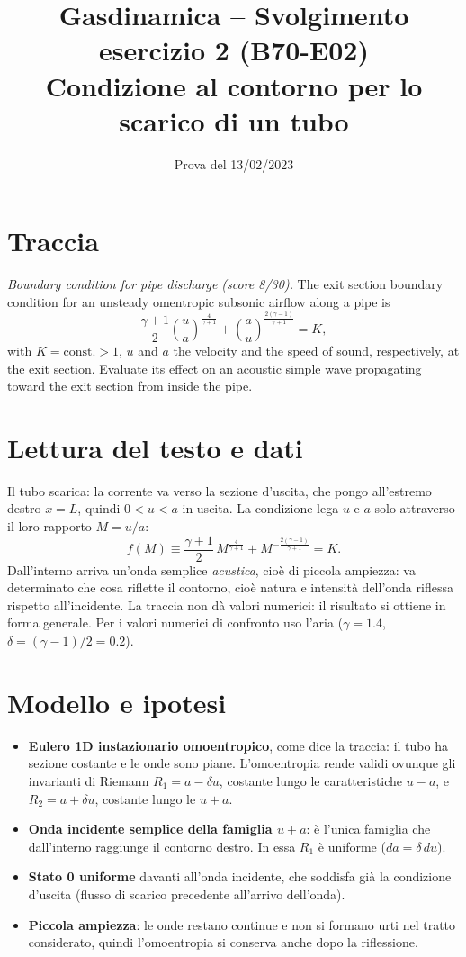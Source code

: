 \documentclass[11pt,a4paper]{article}
\title{Gasdinamica -- Svolgimento esercizio 2 (B70-E02)\\[2pt]
\large Condizione al contorno per lo scarico di un tubo}
\author{}
\date{Prova del 13/02/2023}
\newcommand{\uma}{u-a}
\newcommand{\upa}{u+a}
\newcommand{\Ru}{R_1}
\newcommand{\Rd}{R_2}
\begin{document}
\maketitle

\section*{Traccia}
\emph{Boundary condition for pipe discharge (score 8/30).} The exit section boundary condition for an unsteady
omentropic subsonic airflow along a pipe is
\[
  \frac{\gamma+1}{2}\left(\frac ua\right)^{\frac{4}{\gamma+1}}+\left(\frac au\right)^{\frac{2(\gamma-1)}{\gamma+1}}=K,
\]
with $K=\text{const.}>1$, $u$ and $a$ the velocity and the speed of sound, respectively, at the exit section.
Evaluate its effect on an acoustic simple wave propagating toward the exit section from inside the pipe.

\section{Lettura del testo e dati}
Il tubo scarica: la corrente va verso la sezione d'uscita, che pongo all'estremo destro $x=L$, quindi
$0<u<a$ in uscita. La condizione lega $u$ e $a$ solo attraverso il loro rapporto $M=u/a$:
\[
  f(M)\equiv\frac{\gamma+1}{2}\,M^{\frac{4}{\gamma+1}}+M^{-\frac{2(\gamma-1)}{\gamma+1}}=K .
\]
Dall'interno arriva un'onda semplice \emph{acustica}, cioè di piccola ampiezza: va determinato che cosa
riflette il contorno, cioè natura e intensità dell'onda riflessa rispetto all'incidente. La traccia non dà
valori numerici: il risultato si ottiene in forma generale. Per i valori numerici di confronto uso l'aria
($\gamma=\num{1.4}$, $\delta=(\gamma-1)/2=\num{0.2}$).

\section{Modello e ipotesi}
\begin{itemize}
  \item \textbf{Eulero 1D instazionario omoentropico}, come dice la traccia: il tubo ha sezione costante e le onde
    sono piane. L'omoentropia rende validi ovunque gli invarianti di Riemann
    $\Ru=a-\delta u$, costante lungo le caratteristiche $\uma$, e $\Rd=a+\delta u$, costante lungo le $\upa$.
  \item \textbf{Onda incidente semplice della famiglia $\upa$}: è l'unica famiglia che dall'interno raggiunge il
    contorno destro. In essa $\Ru$ è uniforme ($da=\delta\,du$).
  \item \textbf{Stato 0 uniforme} davanti all'onda incidente, che soddisfa già la condizione d'uscita (flusso di
    scarico precedente all'arrivo dell'onda).
  \item \textbf{Piccola ampiezza}: le onde restano continue e non si formano urti nel tratto considerato, quindi
    l'omoentropia si conserva anche dopo la riflessione.
\end{itemize}
\end{document}
